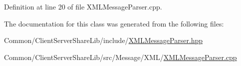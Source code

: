 Definition at line 20 of file X\+M\+L\+Message\+Parser.\+cpp.



The documentation for this class was generated from the following files\+:\begin{DoxyCompactItemize}
\item 
Common/\+Client\+Server\+Share\+Lib/include/\hyperlink{_x_m_l_message_parser_8hpp}{X\+M\+L\+Message\+Parser.\+hpp}\item 
Common/\+Client\+Server\+Share\+Lib/src/\+Message/\+X\+M\+L/\hyperlink{_x_m_l_message_parser_8cpp}{X\+M\+L\+Message\+Parser.\+cpp}\end{DoxyCompactItemize}
